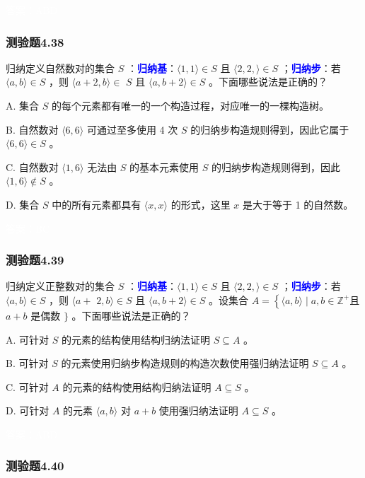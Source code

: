 \documentclass[UTF8, heading=true]{ctexart}
\begin{document}
\textcolor{white}{答案：ABD}

\subsubsection{测验题4.38}

归纳定义自然数对的集合 $S$ ：\textcolor{blue}{\textbf{归纳基}}：$\langle 1,1\rangle \in S$ 且 $\langle 2,2,\rangle \in S$ ；\textcolor{blue}{\textbf{归纳步}}：若 $\langle a, b\rangle \in S$ ，则 $\langle a+2, b\rangle \in$ $S$ 且 $\langle a, b+2\rangle \in S$ 。下面哪些说法是正确的？

A. 集合 $S$ 的每个元素都有唯一的一个构造过程，对应唯一的一棵构造树。

B. 自然数对 $\langle 6,6\rangle$ 可通过至多使用 4 次 $S$ 的归纳步构造规则得到，因此它属于 $\langle 6,6\rangle \in S$ 。

C. 自然数对 $\langle 1,6\rangle$ 无法由 $S$ 的基本元素使用 $S$ 的归纳步构造规则得到，因此 $\langle 1,6\rangle \notin S$ 。

D.  集合 $S$ 中的所有元素都具有 $\langle x, x\rangle$ 的形式，这里 $x$ 是大于等于 1 的自然数。

\textcolor{white}{答案：BC}


\subsubsection{测验题4.39}

归纳定义正整数对的集合 $S$ ：\textcolor{blue}{\textbf{归纳基}}：$\langle 1,1\rangle \in S$ 且 $\langle 2,2,\rangle \in S$ ；\textcolor{blue}{\textbf{归纳步}}：若 $\langle a, b\rangle \in S$ ，则 $\langle a+$ $2, b\rangle \in S$ 且 $\langle a, b+2\rangle \in S$ 。设集合 $A=\left\{\langle a, b\rangle \mid a, b \in \mathbb{Z}^{+}\right.$且 $a+b$ 是偶数 $\}$ 。下面哪些说法是正确的？

A. 
可针对 $S$ 的元素的结构使用结构归纳法证明 $S \subseteq A$ 。

B. 
可针对 $S$ 的元素使用归纳步构造规则的构造次数使用强归纳法证明 $S \subseteq A$ 。

C. 
可针对 $A$ 的元素的结构使用结构归纳法证明 $A \subseteq S$ 。

D.  
可针对 $A$ 的元素 $\langle a, b\rangle$ 对 $a+b$ 使用强归纳法证明 $A \subseteq S$ 。

\textcolor{white}{答案：ABD}

\subsubsection{测验题4.40}
\end{document}

